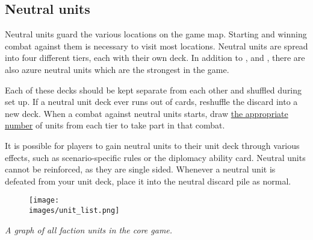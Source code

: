 \subsection*{Neutral units}
Neutral units guard the various locations on the game map.
Starting and winning combat against them is necessary to visit most locations.
Neutral units are spread into four different tiers, each with their own deck.
In addition to ,  and , there are also azure  neutral units which are the strongest in the game.\par
Each of these decks should be kept separate from each other and shuffled during set up.
If a neutral unit deck ever runs out of cards, reshuffle the discard into a new deck.
When a combat against neutral units starts, draw \hyperlink{Difficulty}{the appropriate number} of units from each tier to take part in that combat.\par
It is possible for players to gain neutral units to their unit deck through various effects, such as scenario-specific rules or the diplomacy ability card.
Neutral units cannot be reinforced, as they are single sided.
Whenever a neutral unit is defeated from your unit deck, place it into the neutral discard pile as normal.
\begin{figure}[h]
  \centering
  \texttt{[image: \\images/unit\_list.png]}
\end{figure}
\begin{center}
  \textit{A graph of all faction units in the core game.}
\end{center}

